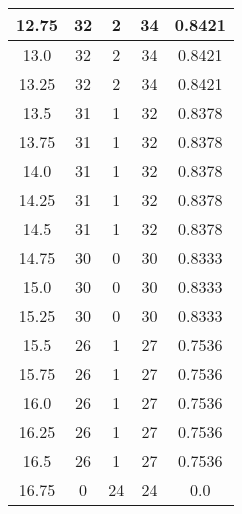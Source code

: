 \documentclass[letterpaper, 12pt]{article}
\begin{document}
\begin{longtable}{|c|c|c|c|c|}
\hline
12.75 & 32 & 2 & 34 & 0.8421 \\
\hline
13.0 & 32 & 2 & 34 & 0.8421 \\
\hline
13.25 & 32 & 2 & 34 & 0.8421 \\
\hline
13.5 & 31 & 1 & 32 & 0.8378 \\
\hline
13.75 & 31 & 1 & 32 & 0.8378 \\
\hline
14.0 & 31 & 1 & 32 & 0.8378 \\
\hline
14.25 & 31 & 1 & 32 & 0.8378 \\
\hline
14.5 & 31 & 1 & 32 & 0.8378 \\
\hline
14.75 & 30 & 0 & 30 & 0.8333 \\
\hline
15.0 & 30 & 0 & 30 & 0.8333 \\
\hline
15.25 & 30 & 0 & 30 & 0.8333 \\
\hline
15.5 & 26 & 1 & 27 & 0.7536 \\
\hline
15.75 & 26 & 1 & 27 & 0.7536 \\
\hline
16.0 & 26 & 1 & 27 & 0.7536 \\
\hline
16.25 & 26 & 1 & 27 & 0.7536 \\
\hline
16.5 & 26 & 1 & 27 & 0.7536 \\
\hline
16.75 & 0 & 24 & 24 & 0.0 \\
\hline
\end{longtable}
\end{document}
